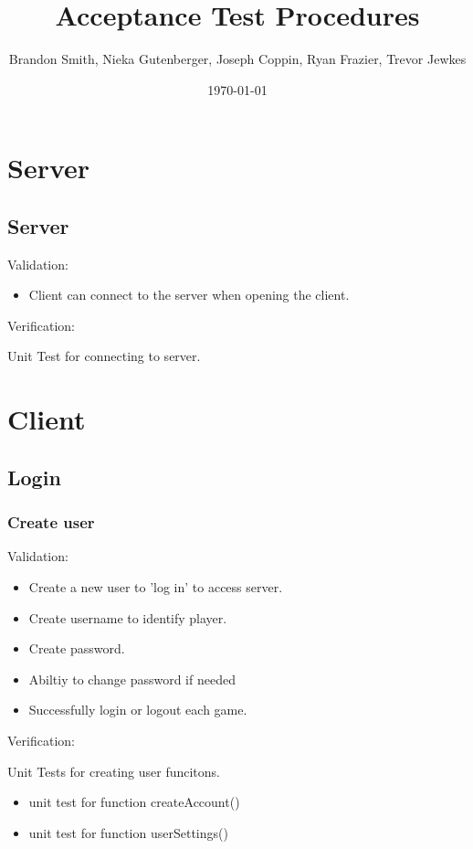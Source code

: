 \documentclass[11pt, titlepage]{article}
\author{Brandon Smith, Nieka Gutenberger, Joseph Coppin, Ryan Frazier, Trevor Jewkes}
\title{Acceptance Test Procedures}
\date{\today}
\begin{document}
	\maketitle
	\setcounter{tocdepth}{1}
	\section{Server}
	
		\subsection{Server}
		Validation:
		\begin{itemize}
			\item Client can connect to the server when opening the client.
		\end{itemize}
		Verification:
		
		Unit Test for connecting to server.

			
	\section{Client}
	
		\subsection{Login}
			\subsubsection{Create user}
			Validation:
			\begin{itemize} 
				\item Create a new user to 'log in' to access server.
				\item Create username to identify player.
				\item Create password.
				\item Abiltiy to change password if needed
				\item Successfully login or logout each game.
			\end{itemize}
			
			Verification:
			
			Unit Tests for creating user funcitons.
			\begin{itemize}
				\item unit test for function createAccount()			
				\item unit test for function userSettings()
			\end{itemize}
\end{document}
